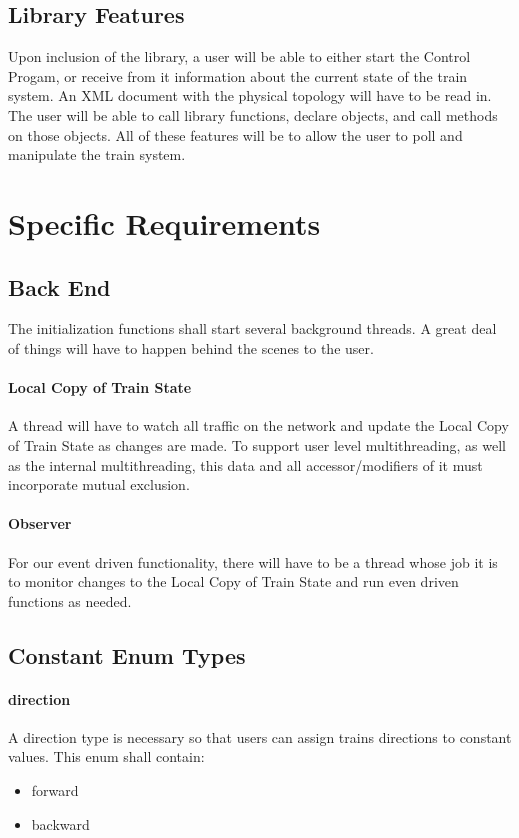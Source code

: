 \documentclass[a4paper,11pt,notitlepage]{article}
\def\CS{Control Progam\xspace} \def\LC{Local Copy of Train State\xspace} \def\TN{Track Node\xspace}
\begin{document}
\subsection{Library Features}
Upon inclusion of the library, a user will be able to either start the \CS, or receive from it information about the current state of the train system. An XML document with the physical topology will have to be read in. The user will be able to call library functions, declare objects, and call methods on those objects. All of these features will be to allow the user to poll and manipulate the train system.

\newpage
\section{Specific Requirements}
\subsection{Back End}
The initialization functions shall start several background threads. A great deal of things will have to happen behind the scenes to the user.
\paragraph{\LC} A thread will have to watch all traffic on the network and update the \LC as changes are made. To support user level multithreading, as well as the internal multithreading, this data and all accessor/modifiers of it must incorporate mutual exclusion.
\paragraph{Observer} For our event driven functionality, there will have to be a thread whose job it is to monitor changes to the \LC and run even driven functions as needed.
\subsection{Constant Enum Types}
\paragraph{direction} A direction type is necessary so that users can assign trains directions to constant values. This enum shall contain:
\begin{itemize}
\item forward
\item backward
\end{itemize}
\end{document}
